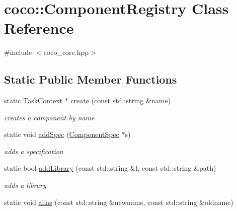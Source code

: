 \hypertarget{classcoco_1_1_component_registry}{}\section{coco\+:\+:Component\+Registry Class Reference}
\label{classcoco_1_1_component_registry}


{\ttfamily \#include $<$coco\+\_\+core.\+hpp$>$}

\subsection*{Static Public Member Functions}
\begin{DoxyCompactItemize}
\item 
\hypertarget{classcoco_1_1_component_registry_ac4659b3aeddd79e58d205dd706085b58}{}static \hyperlink{classcoco_1_1_task_context}{Task\+Context} $\ast$ \hyperlink{classcoco_1_1_component_registry_ac4659b3aeddd79e58d205dd706085b58}{create} (const std\+::string \&name)\label{classcoco_1_1_component_registry_ac4659b3aeddd79e58d205dd706085b58}

\begin{DoxyCompactList}\small\item\em creates a component by name \end{DoxyCompactList}\item 
\hypertarget{classcoco_1_1_component_registry_ac242dec3121dc83d32638c092541889f}{}static void \hyperlink{classcoco_1_1_component_registry_ac242dec3121dc83d32638c092541889f}{add\+Spec} (\hyperlink{classcoco_1_1_component_spec}{Component\+Spec} $\ast$s)\label{classcoco_1_1_component_registry_ac242dec3121dc83d32638c092541889f}

\begin{DoxyCompactList}\small\item\em adds a specification \end{DoxyCompactList}\item 
\hypertarget{classcoco_1_1_component_registry_ac7b83f380957618ffad187bc345388b6}{}static bool \hyperlink{classcoco_1_1_component_registry_ac7b83f380957618ffad187bc345388b6}{add\+Library} (const std\+::string \&l, const std\+::string \&path)\label{classcoco_1_1_component_registry_ac7b83f380957618ffad187bc345388b6}

\begin{DoxyCompactList}\small\item\em adds a library \end{DoxyCompactList}\item 
\hypertarget{classcoco_1_1_component_registry_a7ea3fd330fc435501d855c1b4c7aa3fe}{}static void \hyperlink{classcoco_1_1_component_registry_a7ea3fd330fc435501d855c1b4c7aa3fe}{alias} (const std\+::string \&newname, const std\+::string \&oldname)\label{classcoco_1_1_component_registry_a7ea3fd330fc435501d855c1b4c7aa3fe}


\end{DoxyCompactItemize}
